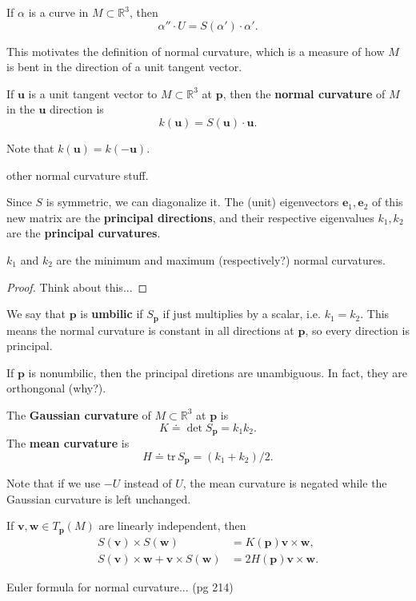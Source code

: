 \documentclass[10pt]{report}
\begin{document}
\begin{prop}
If $\alpha$ is a curve in $M \subset \mathbb{R}^3$, then
\[
	\alpha'' \cdot U = S(\alpha') \cdot \alpha'.
\] 
\end{prop}

This motivates the definition of normal curvature, which is a measure of how $M$ is bent in the direction of a unit tangent vector.
\begin{defn}[]
If $\mathbf{u}$ is a unit tangent vector to $M \subset \mathbb{R}^3$ at $\mathbf{p}$, then the \textbf{normal curvature} of $M$ in the $\mathbf{u}$ direction is
\[
	k(\mathbf{u}) = S(\mathbf{u}) \cdot \mathbf{u}.
\] 
\end{defn}

Note that $k(\mathbf{u}) = k(-\mathbf{u})$.

{\color{red}other normal curvature stuff.}

Since $S$ is symmetric, we can diagonalize it. The (unit) eigenvectors $\mathbf{e}_1, \mathbf{e}_2$ of this new matrix are the \textbf{principal directions}, and their respective eigenvalues $k_1,k_2$ are the \textbf{principal curvatures}.

\begin{prop}
	$k_1$ and $k_2$ are the minimum and maximum {\color{red}(respectively?)} normal curvatures.
\end{prop}
\begin{proof}
	{\color{red}Think about this...}
\end{proof}

We say that $\mathbf{p}$ is \textbf{umbilic} if $S_{\mathbf{p}}$ if just multiplies by a scalar, i.e. $k_1=k_2$. This means the normal curvature is constant in all directions at $\mathbf{p}$, so every direction is principal.

If $\mathbf{p}$ is nonumbilic, then the principal diretions are unambiguous. In fact, they are orthongonal {\color{red}(why?)}.

\begin{defn}[]
The \textbf{Gaussian curvature} of $M \subset \mathbb{R}^3$ at $\mathbf{p}$ is
\[
K \doteq \det S_{\mathbf{p}} = k_1 k_2.
\] The \textbf{mean curvature} is
\[
	H \doteq \text{tr}\, S_{\mathbf{p}} = (k_1+k_2)/2.
\] 
\end{defn}

Note that if we use $-U$ instead of $U$, the mean curvature is negated while the Gaussian curvature is left unchanged.

\begin{prop}
	If $\mathbf{v},\mathbf{w} \in T_{\mathbf{p}}(M)$ are linearly independent, then
	\begin{align*}
		S(\mathbf{v}) \times S(\mathbf{w}) &= K(\mathbf{p}) \mathbf{v} \times \mathbf{w}, \\
		S(\mathbf{v}) \times \mathbf{w} + \mathbf{v} \times S(\mathbf{w}) &= 2H(\mathbf{p}) \mathbf{v} \times \mathbf{w}.
	\end{align*}
\end{prop}

{\color{red}Euler formula for normal curvature... (pg 214)}
\end{document}
